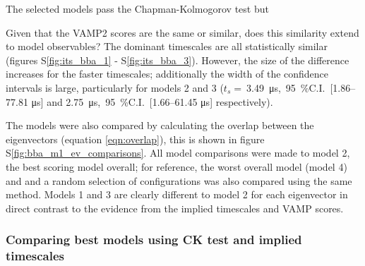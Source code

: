 \documentclass[journal=jacsat,manuscript=article]{achemso}
\newcommand{\SIci}[4]{\SI{#1}{#4},\ \SI{95}{\percent}C.I.\ [\numrange[range-phrase=---]{#2}{#3} \si{#4}]}
\newcommand*\sref[1]{%
    S\ref{#1}}
\begin{document}
The selected models pass the Chapman-Kolmogorov test but 

Given that the VAMP2 scores are the same or similar, does this similarity extend to model observables?  The dominant timescales are all statistically similar (figures \sref{fig:its_bba_1} - \sref{fig:its_bba_3}). However, the size of the difference increases for the faster timescales; additionally the width of the confidence intervals is large, particularly for models 2 and 3 ($t_s =\ $\SIci{ 3.49}{ 1.86}{ 77.81}{\micro\second} and \SIci{ 2.75}{ 1.66}{ 61.45}{\micro\second} respectively). 

The models were also compared by calculating the overlap between the eigenvectors (equation \ref{eqn:overlap}), this is shown in figure \sref{fig:bba_m1_ev_comparisons}. All model comparisons were made to model 2, the best scoring model overall; for reference, the worst overall model (model 4) and and a random selection of configurations was also compared using the same method. Models 1 and 3 are clearly different to model 2 for each eigenvector in direct contrast to the evidence from the implied timescales and VAMP scores. 



\subsubsection{Comparing best models using CK test and implied timescales}
\end{document}
